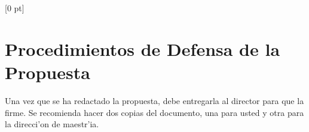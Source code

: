 \titlespacing{\chapter}{0 pt}{30 pt}{50 pt}[0 pt]
\titleformat{\section}{\Large\bfseries}{\thesection}{0 pt}{\hspace{30 pt}}
\titleformat{\subsection}{\large\bfseries}{\thesubsection}{0 pt}{\hspace{30 pt}}
\pagestyle{fancy}
\fancyhead[LO,LE]{\footnotesize\emph{\leftmark}}
\fancyhead[RO,RE]{\thepage}
\fancyfoot[CO,CE]{}

\chapter{Procedimientos de Defensa de la Propuesta} %

\normalsize
Una vez que se ha redactado la propuesta, debe entregarla al director para que la firme. Se recomienda hacer dos copias del documento, una para usted y otra para la direcci'on de maestr'ia.
